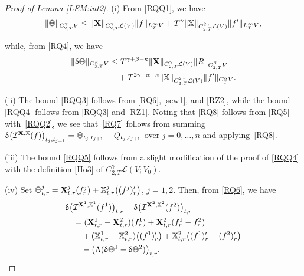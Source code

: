 \documentclass[letterpaper, 11pt,  reqno]{amsart}
\newcommand{\1}{\hspace{0.5mm}\textup{I}\hspace{0.5mm}}
\newcommand{\I}{\mathcal{I}}
\newcommand{\noi}{\noindent}
\renewcommand{\L}{\mathcal{L}}
\newcommand{\al}{\alpha}
\newcommand{\be}{\beta}
\newcommand{\updl}{\updelta}
\newcommand{\kk}{\kappa}
\newcommand{\g}{\gamma}
\newcommand{\Ld}{\Lambda}
\newcommand{\XXb}{\mathbb{X}}
\newcommand{\XX}{\mathbf{X}}
\def\doublestroke#1{\pdfliteral{1 Tr .35 w}#1\pdfliteral{0 Tr 0 w}}
\newcommand{\Taa}{\doublestroke{\Theta}}
\numberwithin{equation}{section}
\numberwithin{theorem}{section}
\begin{document}
\begin{proof}[Proof of Lemma \ref{LEM:int2}]
%
%
%
(i) 
From \eqref{RQQ1}, we have 
\begin{align}
\|\Taa\|_{C^\g_{2, T} V}
\le 
\|\XX\|_{C^\g_{2,T}\L(V)}
\|f \|_{L^\infty_TV}
+  T^{\g}
\|\XXb\|_{C^{2\g}_{2,T}\L(V)}
\|f' \|_{L^\infty_TV}, 
\label{RZ1}
\end{align}



\noi
while, from 
\eqref{RQ4}, 
we have 
\begin{align}
\begin{split}
\|\updl \Taa\|_{C^\kk_{3, T} V}
& \le
 T^{\g + \be - \kk }
\|\XX\|_{C^\g_{2,T}\L(V)}
\| R\|_{C^\be_{2,T}V}\\
& \quad  + 
 T^{2\g+ \al - \kk}
\|\XXb\|_{C^{2\g}_{2,T}\L(V)}
\| f'\|_{C^\al_{T}V}.
\end{split}
\label{RZ2}
\end{align}


\medskip


\noi
(ii)
The bound \eqref{RQQ3} follows
from \eqref{RQ6}, \eqref{sew1},  %
and \eqref{RZ2}, 
while the bound \eqref{RQQ4} follows
from 
\eqref{RQQ3}
and \eqref{RZ1}.
Noting that \eqref{RQ8} follows 
from \eqref{RQ5} with~\eqref{RQQ2}, 
we see that~\eqref{RQ7}
follows from summing
$\updl \big(\I^{\XX, \XXb}(f)\big)
_{t_j, t_{j+1}}
= \Taa_{t_j, t_{j+1}} + 
Q_{t_j, t_{j+1}}$
over $j = 0, \dots, n$
and applying~\eqref{RQ8}.




\medskip


\noi
(iii)
The bound \eqref{RQQ5} follows
from a slight modification of the proof of \eqref{RQQ4}
with the definition \eqref{Ho3}
of $C^\g_{2,T}\L(V; V_0)$.





\medskip


\noi
(iv) 
Set $\Taa^j_{t,r}  = \XX_{t,r}^j(f_r^j) + \XXb_{t,r}^j \big((f^j)'_r\big)$, $j = 1, 2$.
Then, 
from \eqref{RQ6}, we have
\begin{align}
\begin{split}
 \updl  \big( & \I^{\XX^1, \XXb^1}(f^1)\big)_{t, r}
- \updl\big(\I^{\XX^2, \XXb^2}(f^2)\big)_{t, r}\\
& = (\XX_{t,r}^1- \XX_{t,r}^2)(f_r^1)
+ 
\XX_{t,r}^2(f_r^1- f_r^2)\\
& \quad
+ 
(\XXb_{t,r}^1 - \XXb_{t,r}^2) \big((f^1)'_r\big)
+ \XXb_{t,r}^2 \big((f^1)'_r- (f^2)'_r\big)\\
& \quad
- \big(\Ld (\updl  \Taa^1 - \updl  \Taa^2)\big)_{t, r}.
\end{split}
\label{RZ3}
\end{align}


\end{proof}
\end{document}
